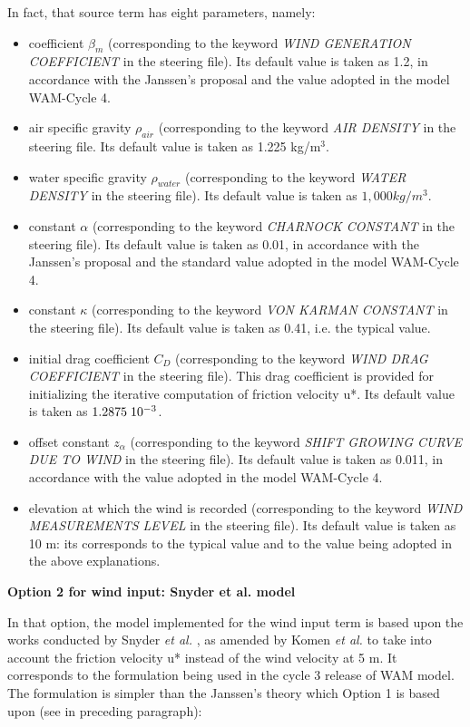 In fact, that source term has eight parameters, namely:

\begin{itemize}
\item  coefficient $\beta_m$ (corresponding to the keyword \textit{WIND GENERATION COEFFICIENT }in the steering file). Its default value is taken as 1.2, in accordance with the Janssen's proposal \cite{Janssen1991} and the value adopted in the model WAM-Cycle 4.
\item  air specific gravity $\rho_{air}$ (corresponding to the keyword \textit{AIR DENSITY} in the steering file. Its default value is taken as 1.225 kg/m${}^{3}$.
\item  water specific gravity ${\rho}_{water}$ (corresponding to the keyword \textit{WATER DENSITY} in the steering file). Its default value is taken as $1,000 kg/m^{3}$.
\item  constant $\alpha$ (corresponding to the keyword \textit{CHARNOCK CONSTANT} in the steering file). Its default value is taken as 0.01, in accordance with the Janssen's proposal and the standard value adopted in the model WAM-Cycle 4.
\item  constant $\kappa$ (corresponding to the keyword \textit{VON KARMAN CONSTANT} in the steering file). Its default value is taken as 0.41, i.e. the typical value.
\item  initial drag coefficient $C_D$ (corresponding to the keyword \textit{WIND DRAG COEFFICIENT} in the steering file). This drag coefficient is provided for initializing the iterative computation of friction velocity u*. Its default value is taken as $1.2875\hspace{.1cm} 10^{-3}$.
\item  offset constant $z_\alpha$ (corresponding to the keyword \textit{SHIFT GROWING CURVE DUE TO WIND} in the steering file). Its default value is taken as 0.011, in accordance with the value adopted in the model WAM-Cycle 4.
\item  elevation at which the wind is recorded (corresponding to the keyword \textit{WIND MEASUREMENTS LEVEL} in the steering file). Its default value is taken as 10 m: its corresponds to the typical value and to the value being adopted in the above explanations.
\end{itemize}


{\bf  Option 2 for wind input: Snyder et al. model}

 In that option, the model implemented for the wind input term is based upon the works conducted by Snyder \textit{et al.} \cite{Snyder1981}, as amended by Komen \textit{et al.} \cite{Komen1984} to take into account the friction velocity u* instead of the wind velocity at 5 m. It corresponds to the formulation being used in the cycle 3 release of WAM model. The formulation is simpler than the Janssen's theory which Option 1 is based upon (see in preceding paragraph):

